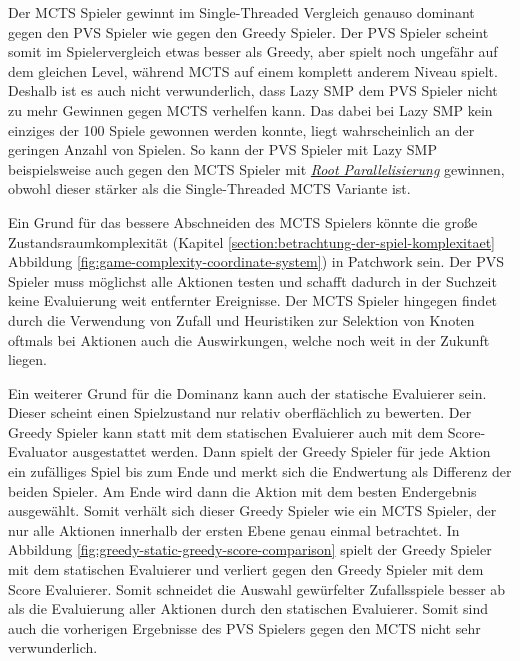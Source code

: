 Der \ac{MCTS} Spieler gewinnt im Single-Threaded Vergleich genauso dominant gegen den \ac{PVS} Spieler wie gegen den Greedy Spieler. Der \ac{PVS} Spieler scheint somit im Spielervergleich etwas besser als Greedy, aber spielt noch ungefähr auf dem gleichen Level, während \ac{MCTS} auf einem komplett anderem Niveau spielt. Deshalb ist es auch nicht verwunderlich, dass Lazy \ac{SMP} dem \ac{PVS} Spieler nicht zu mehr Gewinnen gegen \ac{MCTS} verhelfen kann. Das dabei bei Lazy \ac{SMP} kein einziges der 100 Spiele gewonnen werden konnte, liegt wahrscheinlich an der geringen Anzahl von Spielen. So kann der \ac{PVS} Spieler mit Lazy \ac{SMP} beispielsweise auch gegen den \ac{MCTS} Spieler mit \hyperref[text:root-parallelization]{\emph{Root Parallelisierung}} gewinnen, obwohl dieser stärker als die Single-Threaded \ac{MCTS} Variante ist.

Ein Grund für das bessere Abschneiden des \ac{MCTS} Spielers könnte die große Zustandsraumkomplexität (Kapitel \ref{section:betrachtung-der-spiel-komplexitaet} Abbildung \ref{fig:game-complexity-coordinate-system}) in Patchwork sein. Der \ac{PVS} Spieler muss möglichst alle Aktionen testen und schafft dadurch in der Suchzeit keine Evaluierung weit entfernter Ereignisse. Der \ac{MCTS} Spieler hingegen findet durch die Verwendung von Zufall und Heuristiken zur Selektion von Knoten oftmals bei Aktionen auch die Auswirkungen, welche noch weit in der Zukunft liegen.

Ein weiterer Grund für die Dominanz kann auch der statische Evaluierer sein. Dieser scheint einen Spielzustand nur relativ oberflächlich zu bewerten. Der Greedy Spieler kann statt mit dem statischen Evaluierer auch mit dem Score-Evaluator ausgestattet werden. Dann spielt der Greedy Spieler für jede Aktion ein zufälliges Spiel bis zum Ende und merkt sich die Endwertung als Differenz der beiden Spieler. Am Ende wird dann die Aktion mit dem besten Endergebnis ausgewählt. Somit verhält sich dieser Greedy Spieler wie ein \ac{MCTS} Spieler, der nur alle Aktionen innerhalb der ersten Ebene genau einmal betrachtet. In Abbildung \ref{fig:greedy-static-greedy-score-comparison} spielt der Greedy Spieler mit dem statischen Evaluierer und verliert gegen den Greedy Spieler mit dem Score Evaluierer. Somit schneidet die Auswahl gewürfelter Zufallsspiele besser ab als die Evaluierung aller Aktionen durch den statischen Evaluierer. Somit sind auch die vorherigen Ergebnisse des \ac{PVS} Spielers gegen den \ac{MCTS} nicht sehr verwunderlich.

